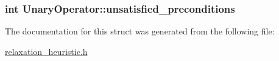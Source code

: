 \hypertarget{structUnaryOperator_ae83816ce19b9d4cf8878553cae81ba98}{
\subsubsection[{unsatisfied\-\_\-preconditions}]{\setlength{\rightskip}{0pt plus 5cm}int Unary\-Operator\-::unsatisfied\-\_\-preconditions}}\label{structUnaryOperator_ae83816ce19b9d4cf8878553cae81ba98}


The documentation for this struct was generated from the following file\-:\begin{DoxyCompactItemize}
\item 
\hyperlink{relaxation__heuristic_8h}{relaxation\-\_\-heuristic.\-h}\end{DoxyCompactItemize}
